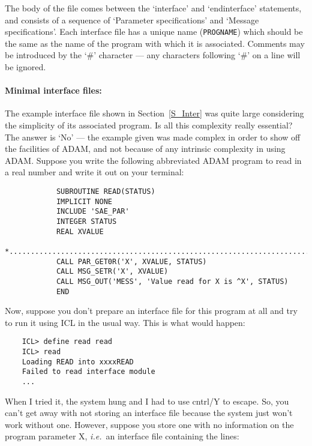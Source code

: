 The body of the file comes between the `interface' and `endinterface'
statements, and consists of a sequence of `Parameter specifications' and
`Message specifications'.
Each interface file has a unique name (\verb+PROGNAME+) which should be the same
as the name of the program with which it is associated.
Comments may be introduced by the `\#' character --- any characters following
`\#' on a line will be ignored.

\paragraph{Minimal interface files:}\hfill

The example interface file shown in Section~\ref{S_Inter} was quite large
considering the simplicity of its associated program.
Is all this complexity really essential?
The answer is `No' --- the example given was made complex in order to show off
the facilities of ADAM, and not because of any intrinsic complexity in
using ADAM.
Suppose you write the following abbreviated ADAM program to read in a real
number and write it out on your terminal:

\begin{small}
\begin{verbatim}
            SUBROUTINE READ(STATUS)
            IMPLICIT NONE
            INCLUDE 'SAE_PAR'
            INTEGER STATUS
            REAL XVALUE
      *.........................................................................
            CALL PAR_GET0R('X', XVALUE, STATUS)
            CALL MSG_SETR('X', XVALUE)
            CALL MSG_OUT('MESS', 'Value read for X is ^X', STATUS)
            END
\end{verbatim}
\end{small}

Now, suppose you don't prepare an interface file for this program at all and
try to run it using ICL in the usual way.
This is what would happen:

\begin{small}
\begin{verbatim}
    ICL> define read read
    ICL> read
    Loading READ into xxxxREAD
    Failed to read interface module
    ...
\end{verbatim}
\end{small}

When I tried it, the system hung and I had to use cntrl/Y to escape.
So, you can't get away with not storing an interface file because the system
just won't work without one.
However, suppose you store one with no information on the program parameter X,
{\em i.e.}\, an interface file containing the lines:

